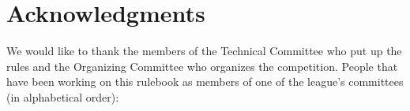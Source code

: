 
\section*{Acknowledgments}\label{sec:acknowledgments}
We would like to thank the members of the Technical Committee who put up the rules and the Organizing Committee who organizes the competition.
People that have been working on this rulebook as members of one of the league's committees (in alphabetical order):
